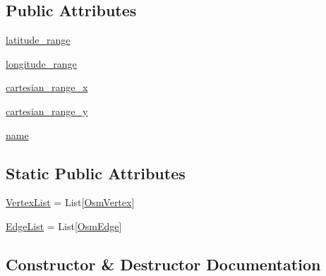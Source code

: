 \subsection*{Public Attributes}
\begin{DoxyCompactItemize}
\item 
\mbox{\hyperlink{classbridges_1_1data__src__dependent_1_1osm_1_1_osm_data_a88caf10c4151c04822cb66af364fd45d}{latitude\+\_\+range}}
\item 
\mbox{\hyperlink{classbridges_1_1data__src__dependent_1_1osm_1_1_osm_data_a7745c671626fb8e97532ff8a9097a780}{longitude\+\_\+range}}
\item 
\mbox{\hyperlink{classbridges_1_1data__src__dependent_1_1osm_1_1_osm_data_a81e77104409461472dcaa68e68eb23da}{cartesian\+\_\+range\+\_\+x}}
\item 
\mbox{\hyperlink{classbridges_1_1data__src__dependent_1_1osm_1_1_osm_data_a5eb0046aadd6da88ca4cac617b054eb3}{cartesian\+\_\+range\+\_\+y}}
\item 
\mbox{\hyperlink{classbridges_1_1data__src__dependent_1_1osm_1_1_osm_data_adb5034420cd207bec97d80fab5e5be3a}{name}}
\end{DoxyCompactItemize}
\subsection*{Static Public Attributes}
\begin{DoxyCompactItemize}
\item 
\mbox{\hyperlink{classbridges_1_1data__src__dependent_1_1osm_1_1_osm_data_aa2bc633ab0d64a560165a1d55cc1f3a4}{Vertex\+List}} = List\mbox{[}\mbox{\hyperlink{classbridges_1_1data__src__dependent_1_1osm_1_1_osm_vertex}{Osm\+Vertex}}\mbox{]}
\item 
\mbox{\hyperlink{classbridges_1_1data__src__dependent_1_1osm_1_1_osm_data_a18b0ef38dba7bedcddd29d38d71d91d2}{Edge\+List}} = List\mbox{[}\mbox{\hyperlink{classbridges_1_1data__src__dependent_1_1osm_1_1_osm_edge}{Osm\+Edge}}\mbox{]}
\end{DoxyCompactItemize}


\subsection{Constructor \& Destructor Documentation}
\mbox{\label{classbridges_1_1data__src__dependent_1_1osm_1_1_osm_data_ab36ec2f4933157aed6c28a02b258afee}} 
